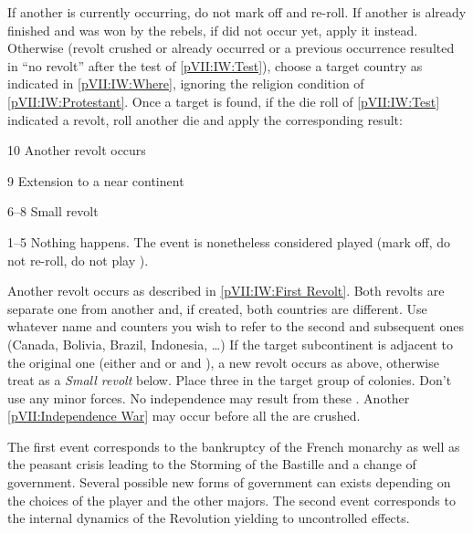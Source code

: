 \condition{}
\aparag If another  is currently occurring, do
not mark off and re-roll.
\aparag If another  is already finished and
was won by the rebels, if  did not occur
yet, apply it instead.
\aparag Otherwise (revolt crushed or 
already occurred or a previous occurrence resulted in ``no revolt'' after the
test of \ref{pVII:IW:Test}), choose a target country as indicated in
\ref{pVII:IW:Where}, ignoring the religion condition of
\ref{pVII:IW:Protestant}.
\aparag Once a target is found, if the die roll of \ref{pVII:IW:Test}
indicated a revolt, roll another die and apply the corresponding result:
\begin{modlist}[1.5em]
\item[10] Another revolt occurs
\item[9] Extension to a near continent
\item[6--8] Small revolt
\item[1--5] Nothing happens. The event is nonetheless considered played (mark
  off, do not re-roll, do not play \RD).
\end{modlist}
 Another revolt occurs as described in
\ref{pVII:IW:First Revolt}. Both revolts are separate one from another and, if
created, both countries are different. Use whatever name and counters you wish
to refer to the second and subsequent ones (Canada, Bolivia, Brazil,
Indonesia, \ldots)
 If the target subcontinent is adjacent
to the original one (either  and  %
or \continentIndia and \continentAsia), a new revolt occurs as above,
otherwise treat as a \emph{Small revolt} below.
 Place three \REVOLT \facemoins in the target group of
colonies. Don't use any minor forces. No independence may result from these
\REVOLT . Another \ref{pVII:Independence War} may occur before all the \REVOLT
are crushed.




\begin{histoire}
  The first event corresponds to the bankruptcy of the French monarchy as well
  as the peasant crisis leading to the Storming of the Bastille and a change
  of government. Several possible new forms of government can exists depending
  on the choices of the player and the other majors. The second event
  corresponds to the internal dynamics of the Revolution yielding to
  uncontrolled effects.
\end{histoire}

